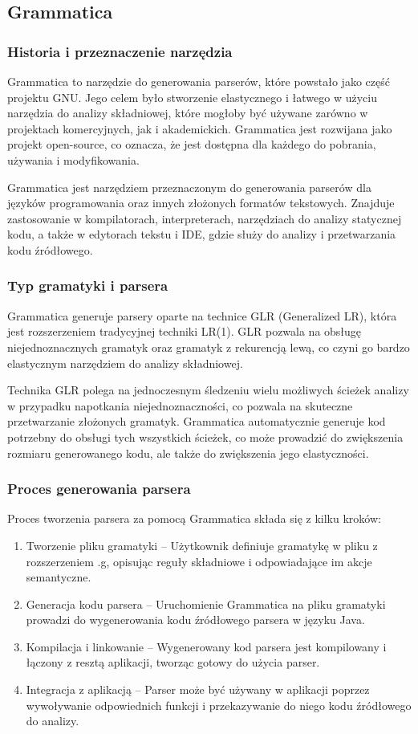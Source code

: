 \documentclass[12pt,twoside]{article}
\begin{document}
\subsection{Grammatica}

\subsubsection{Historia i przeznaczenie narzędzia}
Grammatica to narzędzie do generowania parserów, które powstało jako część projektu GNU. Jego celem było stworzenie elastycznego i łatwego w użyciu narzędzia do analizy składniowej, które mogłoby być używane zarówno w projektach komercyjnych, jak i akademickich. Grammatica jest rozwijana jako projekt open-source, co oznacza, że jest dostępna dla każdego do pobrania, używania i modyfikowania.

Grammatica jest narzędziem przeznaczonym do generowania parserów dla języków programowania oraz innych złożonych formatów tekstowych. Znajduje zastosowanie w kompilatorach, interpreterach, narzędziach do analizy statycznej kodu, a także w edytorach tekstu i IDE, gdzie służy do analizy i przetwarzania kodu źródłowego.

\subsubsection{Typ gramatyki i parsera}
Grammatica generuje parsery oparte na technice GLR (Generalized LR), która jest rozszerzeniem tradycyjnej techniki LR(1). GLR pozwala na obsługę niejednoznacznych gramatyk oraz gramatyk z rekurencją lewą, co czyni go bardzo elastycznym narzędziem do analizy składniowej.

Technika GLR polega na jednoczesnym śledzeniu wielu możliwych ścieżek analizy w przypadku napotkania niejednoznaczności, co pozwala na skuteczne przetwarzanie złożonych gramatyk. Grammatica automatycznie generuje kod potrzebny do obsługi tych wszystkich ścieżek, co może prowadzić do zwiększenia rozmiaru generowanego kodu, ale także do zwiększenia jego elastyczności.

\subsubsection{Proces generowania parsera}
Proces tworzenia parsera za pomocą Grammatica składa się z kilku kroków:
\begin{enumerate}[label=\arabic*), leftmargin=1.25cm]
    \item Tworzenie pliku gramatyki -- Użytkownik definiuje gramatykę w pliku z rozszerzeniem .g, opisując reguły składniowe i odpowiadające im akcje semantyczne.
    \item Generacja kodu parsera -- Uruchomienie Grammatica na pliku gramatyki prowadzi do wygenerowania kodu źródłowego parsera w języku Java.
    \item Kompilacja i linkowanie -- Wygenerowany kod parsera jest kompilowany i łączony z resztą aplikacji, tworząc gotowy do użycia parser.
    \item Integracja z aplikacją -- Parser może być używany w aplikacji poprzez wywoływanie odpowiednich funkcji i przekazywanie do niego kodu źródłowego do analizy.
\end{enumerate}
\end{document}
